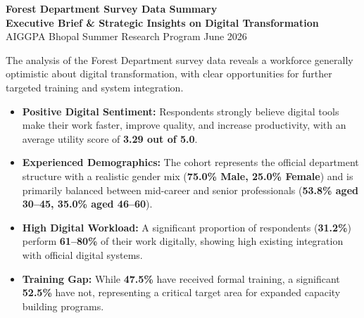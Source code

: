\documentclass[10pt,a4paper]{article}
\begin{document}

\begin{center}
  {\fontsize{13}{15}\selectfont\bfseries\color{navyblue}
  Forest Department Survey Data Summary\\[2pt]
  {\fontsize{10.5}{12}\selectfont\bfseries\color{accentteal}Executive Brief \& Strategic Insights on Digital Transformation}}\\[3pt]
  {\small\color{darkgray} AIGGPA Bhopal Summer Research Program \quad\textbar\quad June 2026}
\end{center}

\vspace{-0.2cm}
\noindent
\small The analysis of the Forest Department survey data reveals a workforce generally optimistic about digital transformation, with clear opportunities for further targeted training and system integration.

\vspace{0.1cm}

\begin{tcolorbox}[colback=navyblue!4,colframe=navyblue,leftrule=3.5pt,rightrule=0pt,toprule=0pt,bottomrule=0pt,arc=0pt,top=4pt,bottom=4pt,left=8pt,right=8pt]
\fontsize{9}{12}\selectfont
{}
\begin{itemize}
  \item \textbf{Positive Digital Sentiment:} Respondents strongly believe digital tools make their work faster, improve quality, and increase productivity, with an average utility score of \textbf{3.29 out of 5.0}.
  \item \textbf{Experienced Demographics:} The cohort represents the official department structure with a realistic gender mix (\textbf{75.0\% Male, 25.0\% Female}) and is primarily balanced between mid-career and senior professionals (\textbf{53.8\% aged 30--45, 35.0\% aged 46--60}).
  \item \textbf{High Digital Workload:} A significant proportion of respondents (\textbf{31.2\%}) perform \textbf{61--80\%} of their work digitally, showing high existing integration with official digital systems.
  \item \textbf{Training Gap:} While \textbf{47.5\%} have received formal training, a significant \textbf{52.5\%} have not, representing a critical target area for expanded capacity building programs.
\end{itemize}
\end{tcolorbox}
\end{document}
